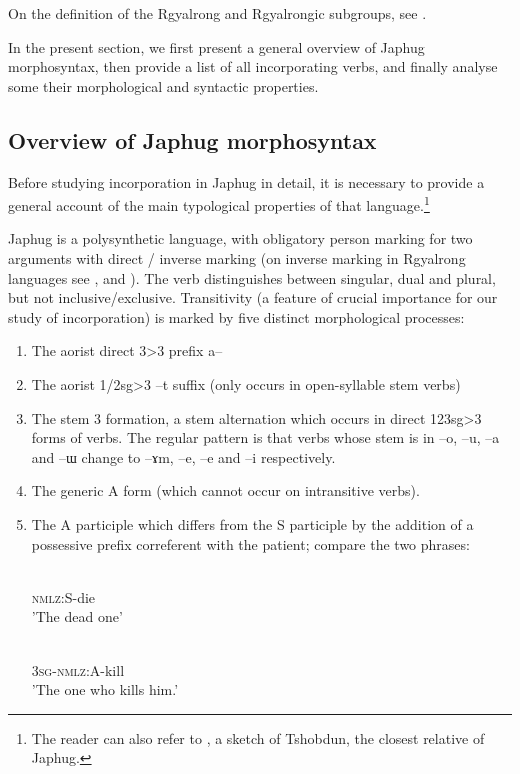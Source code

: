 \documentclass[oldfontcommands,oneside,a4paper,11pt]{article}
\newcommand{\ipa}[1]{{\phon #1}} %
\newcommand{\nmlz}{\textsc{nmlz}}
\newcommand{\sg}{\textsc{sg}}
\begin{document}
On the definition of the Rgyalrong and Rgyalrongic subgroups, see \citet{jackson00sidaba}.
 
In the present section, we first present a general overview of Japhug morphosyntax, then provide a list of all incorporating verbs, and finally analyse some their morphological and syntactic properties.

 \subsection{Overview of Japhug morphosyntax}
 Before studying incorporation in Japhug in detail, it is necessary to provide a general account of the main typological properties of that language.\footnote{The reader can also refer to  \citet{jackson03caodeng}, a sketch of Tshobdun, the closest relative of Japhug.}
 
 
 Japhug is a polysynthetic language, with obligatory person marking for two arguments with direct / inverse marking (on inverse marking in Rgyalrong languages see \citealt{delancey81direction},  \citealt{jackson02rentongdengdi} and  \citealt{jacques10inverse}). The verb distinguishes between singular, dual and plural, but not inclusive/exclusive. Transitivity (a feature of crucial importance for our study of incorporation) is marked by five distinct morphological processes:

 
 \begin{enumerate}
\item The aorist direct 3>3 prefix \ipa{a}--
\item The aorist 1/2sg>3 --\ipa{t} suffix (only occurs in open-syllable stem verbs)
\item The stem 3 formation, a stem alternation which occurs in direct 123sg>3 forms of verbs. The regular pattern is that verbs whose stem is in --\ipa{o}, --\ipa{u}, --\ipa{a} and --\ipa{ɯ} change to --\ipa{ɤm}, --\ipa{e}, --\ipa{e} and --\ipa{i} respectively.
\item The generic A form (which cannot occur on intransitive verbs).
\item The A participle which differs from the S participle by the addition of a possessive prefix correferent with the patient; compare the two phrases:
 \begin{exe}
\ex
\gll \ipa{kɯ-si}    \\
  \nmlz{}:S-die \\
 \glt  'The dead one'
 
\ex
\gll \ipa{ɯ-kɯ-sat}    \\
  3\sg{}-\nmlz{}:A-kill \\
 \glt  'The one who kills him.'

\end{exe}  

\end{enumerate} 
 
\end{document}

